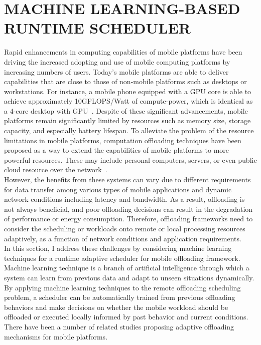 \chapter{MACHINE LEARNING-BASED RUNTIME SCHEDULER}
\label{chap:scheduler}
Rapid enhancements in computing capabilities of mobile platforms have
been driving the increased adopting and use of mobile computing
platforms by increasing numbers of users.
%
Today's mobile platforms are able to deliver capabilities that are close
to those of non-mobile platforms such as desktops or workstations.
%
For instance, a mobile phone equipped with a GPU core is able to achieve
approximately 10GFLOPS/Watt of compute-power, which is identical as a
4-core desktop with GPU~\cite{soyata}.
%
Despite of these significant advancements, mobile platforms remain
significantly limited by resources such as memory size, storage
capacity, and especially battery lifespan.
%
To alleviate the problem of the resource limitations in mobile
platforms, computation offloading techniques have been proposed as a way
to extend the capabilities of mobile platforms to more powerful
resources.
%
These may include personal computers, servers, or even public cloud
resource over the network~\cite{snarf, maui, cuckoo}.\\
%
However, the benefits from these systems can vary due to different
requirements for data transfer among various types of mobile
applications and dynamic network conditions including latency and
bandwidth.
%
As a result, offloading is not always beneficial, and poor offloading
decisions can result in the degradation of performance or energy
consumption.
%
Therefore, offloading frameworks need to consider the scheduling or
workloads onto remote or local processing resources adaptively, as a
function of network conditions and application requirements.\\
%
In this section, I address these challenges by considering machine
learning techniques for a runtime adaptive scheduler for mobile
offloading framework.
%
Machine learning technique is a branch of artificial intelligence
through which a system can learn from previous data and adapt to unseen
situations dynamically.
%
By applying machine learning techniques to the remote offloading
scheduling problem, a scheduler can be automatically trained from
previous offloading behaviors and make decisions on whether the mobile
workload should be offloaded or executed locally informed by past
behavior and current conditions.
%
There have been a number of related studies proposing adaptive
offloading mechanisms for mobile platforms.
